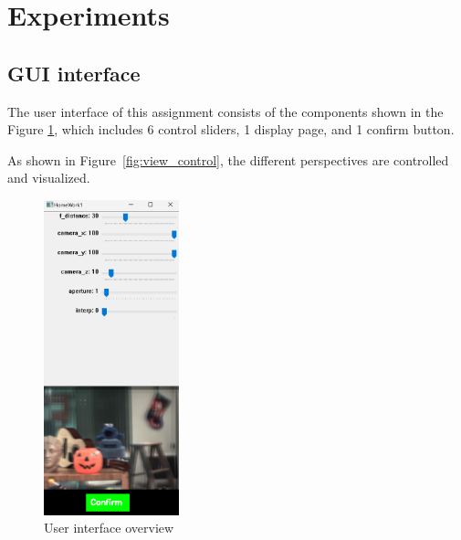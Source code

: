 \documentclass{article}
\begin{document}
\section{Experiments}
\subsection{GUI interface}
The user interface of this assignment consists of the components shown in the Figure \ref{fig:ui}, which includes 6 control sliders, 1 display page, and 1 confirm button.

As shown in Figure~\ref{fig:view_control}, the different perspectives are controlled and visualized.
\begin{figure}[htbp]
    \centering
    \includegraphics[width=0.35\textwidth]{GUI.png} %
    \caption{User interface overview}
    \label{fig:ui}
\end{figure}
\end{document}
